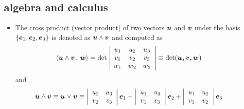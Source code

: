 \documentclass[11pt]{article}
\begin{document}
\subsection{algebra and calculus}
\begin{itemize}
\item The cross product (vector product) of two vectors $\boldsymbol{u}$ and $\boldsymbol{v}$ under the basis $\left\{\boldsymbol{e}_{1}, \boldsymbol{e}_{2}, \boldsymbol{e}_{3}\right\}$ is denoted as $\boldsymbol{u}\wedge \boldsymbol{v}$ and computed as
\begin{align}
\left\langle \boldsymbol{u}\wedge \boldsymbol{v}\,,\, \boldsymbol{w} \right\rangle &= \det\left\lvert \begin{array}{ccc}
u_{1} & u_{2} & u_{3} \\ 
v_{1} & v_{2} & v_{3} \\ 
w_{1} & w_{2} & w_{3}
\end{array}  \right\rvert  \equiv \det(\boldsymbol{u, v, w})\label{eqn: cross_prod}
\end{align}
and
\begin{align}
\boldsymbol{u}\wedge \boldsymbol{v} \equiv \boldsymbol{u} \times \boldsymbol{v} &\equiv \left\lvert \begin{array}{cc}
u_{2} & u_{3} \\ 
v_{2} & v_{3}
\end{array}  \right\rvert\boldsymbol{e}_{1}
- 
\left\lvert \begin{array}{cc}
u_{1} & u_{3} \\ 
v_{1} & v_{3}
\end{array}  \right\rvert\boldsymbol{e}_{2}
+
\left\lvert \begin{array}{cc}
u_{1} & u_{2} \\ 
v_{1} & v_{2}
\end{array}  \right\rvert\boldsymbol{e}_{3}  \label{eqn: cross_prod2}
\end{align}

\end{itemize}
\end{document}
